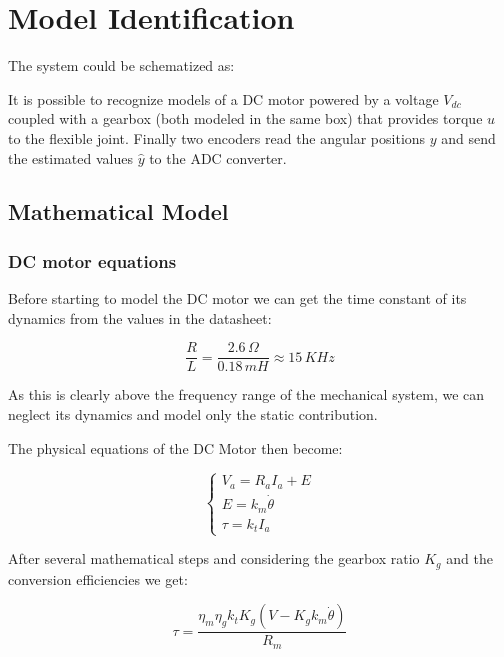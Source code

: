 \chapter{Model Identification}
\label{cha:model_identification}

    The system could be schematized as:


    It is possible to recognize models of a DC motor powered by a voltage $V_{dc}$ coupled with a gearbox (both modeled in the same box) that provides torque $u$ to the flexible joint. Finally two encoders read the angular positions $y$ and send the estimated values $\hat{y}$ to the ADC converter.

    \section{Mathematical Model}

        \subsection{DC motor equations}

            Before starting to model the DC motor we can get the time constant of its dynamics from the values in the datasheet:

            \[
                \frac{R}{L} = \frac{2.6 \, \Omega}{0.18 \, mH} \approx  15 \, KHz
            \]
                
            As this is clearly above the frequency range of the mechanical system, we can neglect its dynamics and model only the static contribution.
            
            The physical equations of the DC Motor then become:
            
            \begin{equation*}
                \begin{cases}
                    V_a = R_a I_a + E \\
                    E = k_m \dot\theta \\
                    \tau = k_t I_a
                \end{cases}
            \end{equation*}

            After several mathematical steps and considering the gearbox ratio $K_g$ and the conversion efficiencies we get:

            \[
                \tau = \frac{\eta_m\eta_g k_t K_g(V - K_g k_m\dot\theta)}{R_m} 
            \]
            
